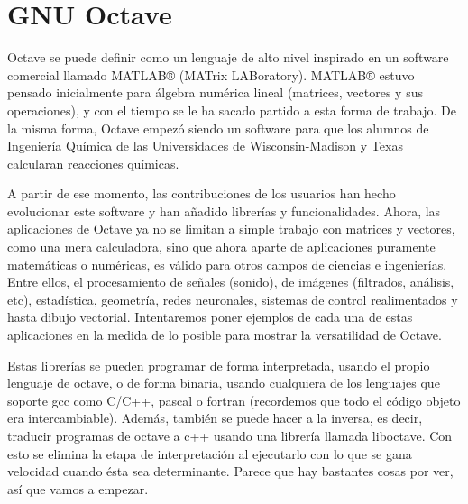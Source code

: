 
\chapter{GNU Octave}
\label{octave.tex}



Octave se puede definir como un lenguaje de alto nivel inspirado en un
software  comercial llamado  {\sc MATLAB®}  (MATrix LABoratory).  {\sc
MATLAB®}  estuvo pensado  inicialmente  para  álgebra numérica  lineal
(matrices,  vectores  y  sus  operaciones),  y con  el  tiempo  se  le
ha  sacado  partido a  esta  forma  de  trabajo.  De la  misma  forma,
Octave empezó  siendo un software  para que los alumnos  de Ingeniería
Química de las {\sc Universidades  de Wisconsin-Madison} y {\sc Texas}
calcularan reacciones químicas.

A partir de ese momento, las  contribuciones de los usuarios han hecho
evolucionar este  software y han añadido  librerías y funcionalidades.
Ahora, las  aplicaciones de Octave ya  no se limitan a  simple trabajo
con matrices  y vectores,  como una mera  calculadora, sino  que ahora
aparte de  aplicaciones puramente  matemáticas o numéricas,  es válido
para  otros  campos  de  ciencias   e  ingenierías.  Entre  ellos,  el
procesamiento de  señales (sonido), de imágenes  (filtrados, análisis,
etc), estadística,  geometría, redes  neuronales, sistemas  de control
realimentados y hasta dibujo vectorial. Intentaremos poner ejemplos de
cada una de estas aplicaciones en la medida de lo posible para mostrar
la versatilidad de Octave.

Estas librerías se  pueden programar de forma  interpretada, usando el
propio  lenguaje de  octave,  o de  forma  binaria, usando  cualquiera
de  los  lenguajes  que  soporte  {\sf gcc}  como  {\sf  C/C++},  {\sf
pascal}  o {\sf  fortran} (recordemos  que todo  el código  objeto era
intercambiable).  Además, también  se  puede hacer  a  la inversa,  es
decir, traducir programas de octave  a c++ usando una librería llamada
{\sf liboctave}.  Con esto  se elimina la  etapa de  interpretación al
ejecutarlo con lo que se  gana velocidad cuando ésta sea determinante.
Parece que hay bastantes cosas por ver, así que vamos a empezar.


